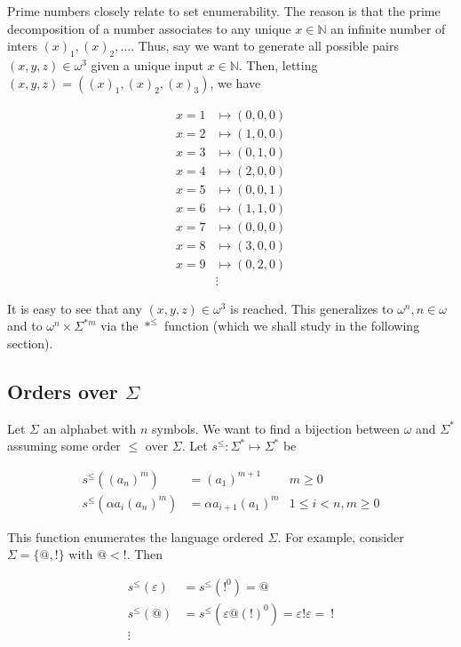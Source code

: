 \documentclass[a4paper, 12pt]{article}
\begin{document}
Prime numbers closely relate to set enumerability. The reason is that the prime
decomposition of a number associates to any unique $x \in \mathbb{N}$ an
infinite number of inters $(x)_1, (x)_2, \ldots$. Thus, say we want to generate
all possible pairs $(x, y, z) \in \omega^3$ given a unique input $x \in
\mathbb{N}$. Then, letting $(x, y, z) = \left( (x)_1, (x)_2, (x)_3 \right) $, we
have 

\begin{align*}
    x = 1 &\mapsto (0, 0, 0)\\ 
    x = 2 &\mapsto (1, 0, 0)\\
    x = 3 &\mapsto (0, 1, 0)\\
    x = 4 &\mapsto (2, 0, 0)\\
    x = 5 &\mapsto (0, 0, 1)\\
    x = 6 &\mapsto (1, 1, 0)\\ 
    x = 7 &\mapsto (0, 0, 0)\\
    x = 8 &\mapsto (3, 0, 0)\\
    x = 9 &\mapsto (0, 2, 0)\\ 
      &\vdots
\end{align*}

It is easy to see that any $(x, y, z) \in \omega^3$ is reached. This generalizes
to $\omega^n, n \in \omega$ and to $\omega^{n} \times \Sigma^{*m} $ via the
$*^{\leq}$ function (which we shall study in the following section).

\subsection{Orders over $\Sigma$}

Let $\Sigma$ an alphabet with $n$ symbols. We want to find a bijection between $\omega$ and
$\Sigma^{*}$ assuming some order $\leq$ over $\Sigma$. Let $s^{\leq} :
\Sigma^{*} \mapsto \Sigma^{*}$ be


\begin{align*}
    s^{\leq} \left( (a_n)^m \right)  &= (a_1)^{m + 1} & m \geq 0\\ 
    s^{\leq} \left( \alpha a_i (a_n)^{m} \right) &= \alpha a_{i+1} (a_1)^{m} & 1
    \leq i < n, m \geq 0
\end{align*}

This function enumerates the language ordered $\Sigma$. For example, consider
$\Sigma = \{@, !\}$ with $@ < !$. Then 

\begin{align*}
    s^{\leq}( \varepsilon ) &= s^{\leq}( !^{0} ) = @\\
    s^{\leq}( @ ) &= s^{\leq}( \varepsilon @ (!)^{0} ) = \varepsilon ! \varepsilon = ~!
    \\ 
    \vdots
\end{align*}
\end{document}
